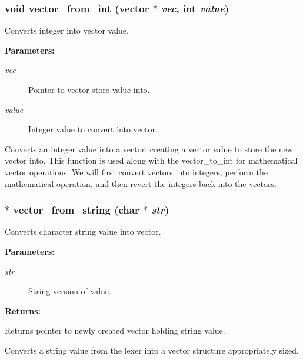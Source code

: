 \subsubsection{\setlength{\rightskip}{0pt plus 5cm}void vector\_\-from\_\-int ({\bf vector} $\ast$ {\em vec}, int {\em value})}\label{vector_8h_a16}


Converts integer into vector value.

\begin{Desc}
\item[{\bf Parameters: }]\par
\begin{description}
\item[
{\em vec}]Pointer to vector store value into. \item[
{\em value}]Integer value to convert into vector.

\end{description}
\end{Desc}
Converts an integer value into a vector, creating a vector value to store the new vector into. This function is used along with the vector\_\-to\_\-int for mathematical vector operations. We will first convert vectors into integers, perform the mathematical operation, and then revert the integers back into the vectors. 
\subsubsection{$\ast$ vector\_\-from\_\-string (char $\ast$ {\em str})}\label{vector_8h_a18}


Converts character string value into vector.

\begin{Desc}
\item[{\bf Parameters: }]\par
\begin{description}
\item[
{\em str}]String version of value.

\end{description}
\end{Desc}
\begin{Desc}
\item[{\bf Returns: }]\par
Returns pointer to newly created vector holding string value.

\end{Desc}
Converts a string value from the lexer into a vector structure appropriately sized. 
